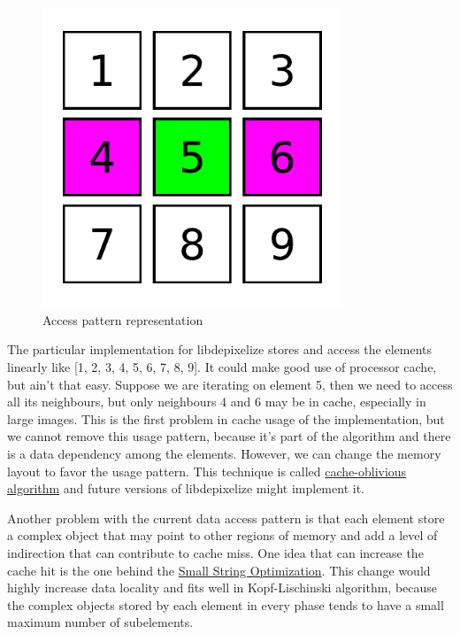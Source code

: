 \begin{figure}[H]
  \centering
  \includegraphics[width=0.8\textwidth]{assets/memory-access.pdf}
  \caption{Access pattern representation}
\end{figure}

The particular implementation for libdepixelize stores and access the elements
linearly like [1, 2, 3, 4, 5, 6, 7, 8, 9]. It could make good use of processor
cache, but ain't that easy. Suppose we are iterating on element 5, then we need
to access all its neighbours, but only neighbours 4 and 6 may be in cache,
especially in large images. This is the first problem in cache usage of the
implementation, but we cannot remove this usage pattern, because it's part of
the algorithm and there is a data dependency among the elements. However, we can
change the memory layout to favor the usage pattern. This technique is called
\href{http://en.wikipedia.org/wiki/Cache-oblivious_algorithm}{cache-oblivious
algorithm} and future versions of libdepixelize might implement it.

Another problem with the current data access pattern is that each element store
a complex object that may point to other regions of memory and add a level of
indirection that can contribute to cache miss. One idea that can increase the
cache hit is the one behind the
\href{http://stackoverflow.com/questions/10315041/meaning-of-acronym-sso-in-the-context-of-stdstring}{Small
String Optimization}. This change would highly increase data locality and fits
well in Kopf-Lischinski algorithm, because the complex objects stored by each
element in every phase tends to have a small maximum number of subelements.
